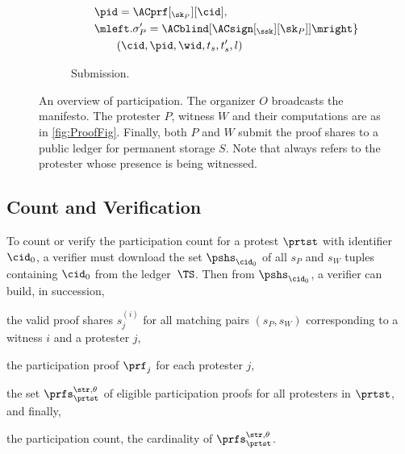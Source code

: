 \begin{figure*}
\begin{subfigure}[b]{0.49\columnwidth}
\begin{align*}
        & \qquad \pid = \ACprf[_{\sk_P}][\cid], \\
        & \qquad \mleft. \sigma_P' = \ACblind[\ACsign[_{\ssk}][\sk_P]] \mright\} 
        \\
        & \qquad\qquad (\cid, \pid, \wid, t_s, t_s', l)
    \end{align*}
    \caption{Submission.}
  \end{subfigure}
  \caption{%
    An overview of \CROCUS participation.\@
    The organizer \(O\) broadcasts the manifesto.
    The protester \(P\), witness \(W\) and their computations are as in \cref{fig:ProofFig}.
    Finally, both \(P\) and \(W\) submit the proof shares to a
   public ledger for permanent storage \(S\). Note that \pid  always refers to the
    protester whose presence is being witnessed.
  }%
  \label{fig:ProtocolOverview}
\end{figure*}


\subsection{Count and Verification}%
\label{ProtocolVerification}



To count or verify the participation count for a protest \(\prtst\) with 
identifier \(\cid_0\), a verifier must download the set \(\pshs_{\cid_0}\) of 
all \(s_P\) and \(s_W\) tuples containing \(\cid_0\) from the ledger~\(\TS\).
Then from \(\pshs_{\cid_0}\), a verifier can build, in succession,
\begin{enumerate*}
\item the valid proof shares \(s_j^{(i)}\) for all matching pairs \((s_P, 
    s_W)\) corresponding to a witness \(i\) and a protester \(j\),
\item the participation proof \(\prf_{j}\) for each protester \(j\),
\item the set \(\prfs_{\prtst}^{\str,\theta}\) of eligible participation proofs 
  for all protesters in \(\prtst\), and finally,
\item the participation count, \ie the cardinality of 
  \(\prfs_{\prtst}^{\str,\theta}\).
\end{enumerate*}

